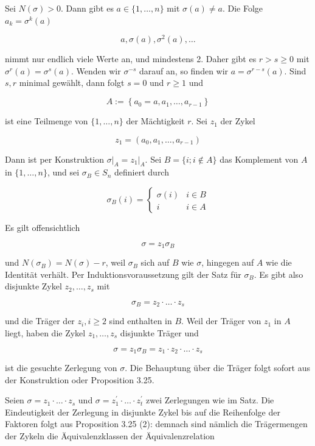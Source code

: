 \documentclass[10pt, letterpaper]{article}
\begin{document}
Sei $N(\sigma)>0$. Dann gibt es $a \in\{1, \ldots, n\}$ mit $\sigma(a) \neq a$. Die Folge $a_{k}=\sigma^{k}(a)$

$$
a, \sigma(a), \sigma^{2}(a), \ldots
$$

nimmt nur endlich viele Werte an, und mindestens 2. Daher gibt es $r>s \geq 0$ mit $\sigma^{r}(a)=\sigma^{s}(a)$. Wenden wir $\sigma^{-s}$ darauf an, so finden wir $a=\sigma^{r-s}(a)$. Sind $s, r$ minimal gewählt, dann folgt $s=0$ und $r \geq 1$ und

$$
A:=\left\{a_{0}=a, a_{1}, \ldots, a_{r-1}\right\}
$$

ist eine Teilmenge von $\{1, \ldots, n\}$ der Mächtigkeit $r$. Sei $z_{1}$ der Zykel

$$
z_{1}=\left(a_{0}, a_{1}, \ldots, a_{r-1}\right)
$$

Dann ist per Konstruktion $\left.\sigma\right|_{A}=\left.z_{1}\right|_{A}$. Sei $B=\{i ; i \notin A\}$ das Komplement von $A$ in $\{1, \ldots, n\}$, und sei $\sigma_{B} \in S_{n}$ definiert durch

$$
\sigma_{B}(i)= \begin{cases}\sigma(i) & i \in B \\ i & i \in A\end{cases}
$$

Es gilt offensichtlich

$$
\sigma=z_{1} \sigma_{B}
$$

und $N\left(\sigma_{B}\right)=N(\sigma)-r$, weil $\sigma_{B}$ sich auf $B$ wie $\sigma$, hingegen auf $A$ wie die Identität verhält. Per Induktionsvoraussetzung gilt der Satz für $\sigma_{B}$. Es gibt also disjunkte Zykel $z_{2}, \ldots, z_{s}$ mit

$$
\sigma_{B}=z_{2} \cdot \ldots \cdot z_{s}
$$

und die Träger der $z_{i}, i \geq 2$ sind enthalten in $B$. Weil der Träger von $z_{1}$ in $A$ liegt, haben die Zykel $z_{1}, \ldots, z_{s}$ disjunkte Träger und

$$
\sigma=z_{1} \sigma_{B}=z_{1} \cdot z_{2} \cdot \ldots \cdot z_{s}
$$

ist die gesuchte Zerlegung von $\sigma$. Die Behauptung über die Träger folgt sofort aus der Konstruktion oder Proposition 3.25.

Seien $\sigma=z_{1} \cdot \ldots \cdot z_{s}$ und $\sigma=z_{1}^{\prime} \cdot \ldots \cdot z_{t}^{\prime}$ zwei Zerlegungen wie im Satz. Die Eindeutigkeit der Zerlegung in disjunkte Zykel bis auf die Reihenfolge der Faktoren folgt aus Proposition 3.25 (2): demnach sind nämlich die Trägermengen der Zykeln die Äquivalenzklassen der Äquivalenzrelation
\end{document}
